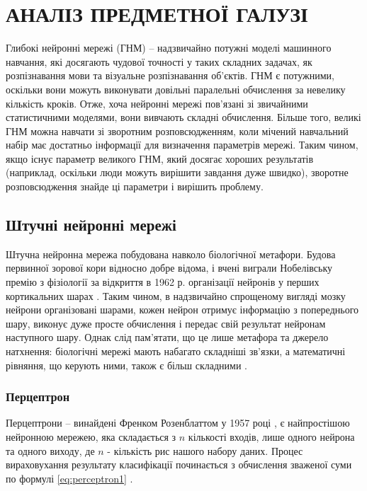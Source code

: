\chapter{АНАЛІЗ ПРЕДМЕТНОЇ ГАЛУЗІ}
Глибокі нейронні мережі (ГНМ) -- надзвичайно потужні моделі машинного навчання,
які досягають чудової точності у таких складних задачах, як
розпізнавання мови та візуальне розпізнавання об’єктів.
ГНМ є потужними, оскільки вони можуть виконувати
довільні паралельні обчислення за невелику кількість кроків.
Отже, хоча нейронні мережі пов’язані
зі звичайними статистичними моделями, вони вивчають складні
обчислення. Більше того, великі ГНМ можна навчати зі
зворотним розповсюдженням, коли мічений навчальний набір має
достатньо інформації для визначення параметрів мережі. Таким
чином, якщо існує параметр великого ГНМ, який досягає хороших
результатів (наприклад, оскільки люди можуть вирішити завдання
дуже швидко), зворотне розповсюдження знайде ці
параметри і вирішить проблему.

\section{Штучні нейронні мережі}
Штучна нейронна мережа побудована навколо біологічної метафори.
Будова первинної зорової кори відносно добре відома,
і вчені виграли Нобелівську премію з фізіології за відкриття в
1962 р. організації нейронів у перших кортикальних
шарах \cite{cortex-stuff}. Таким чином, в надзвичайно
спрощеному вигляді
мозку нейрони організовані шарами, кожен нейрон отримує
інформацію з попереднього шару, виконує дуже просте
обчислення і передає свій результат нейронам наступного
шару. Однак слід пам’ятати, що це лише метафора та джерело
натхнення: біологічні мережі мають набагато складніші
зв’язки, а математичні рівняння, що керують ними, також
є більш складними \cite{cortex-equations}.

\subsection{Перцептрон}
Перцептрони -- винайдені Френком Розенблаттом у 1957 році
\cite{rozenblatt}, є найпростішою
нейронною мережею, яка складається з $n$ кількості входів, лише одного
нейрона та одного виходу, де $n$ - кількість рис нашого набору
даних. Процес вираховухання результату класифікації починається
з обчислення зваженої суми
по формулі \ref{eq:perceptron1} \cite{nn:peyre}.

